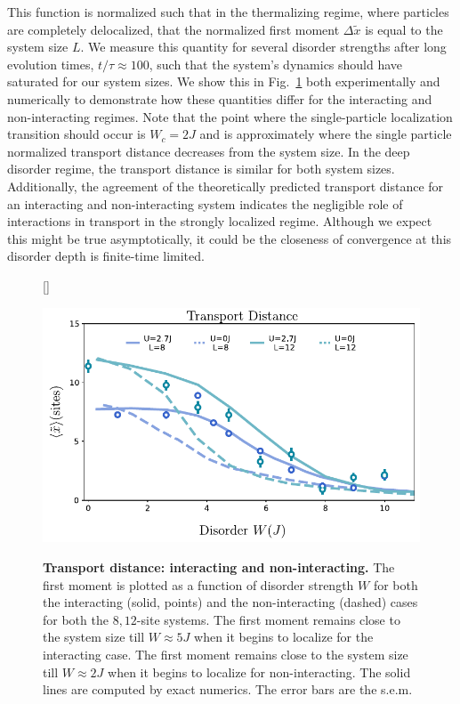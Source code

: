 This function is normalized such that in the thermalizing regime, where particles are completely delocalized, that the normalized first moment $\Delta \tilde{x}$ is equal to the system size $L$. We measure this quantity for several disorder strengths after long evolution times, $t/\tau \approx 100$, such that the system's dynamics should have saturated for our system sizes. We show this in Fig.~\ref{fig:intCorrLen} both experimentally and numerically to demonstrate how these quantities differ for the interacting and non-interacting regimes. Note that the point where the single-particle localization transition should occur is $W_c = 2 J$ and is approximately where the single particle normalized transport distance decreases from the system size. In the deep disorder regime, the transport distance is similar for both system sizes. Additionally, the agreement of the theoretically predicted transport distance for an interacting and non-interacting system indicates the negligible role of interactions in transport in the strongly localized regime. Although we expect this might be true asymptotically, it could be the closeness of convergence at this disorder depth is finite-time limited.


\begin{figure}
[\FBwidth]
{\caption{\textbf{Transport distance: interacting and non-interacting.} The first moment is plotted as a function of disorder strength $W$ for both the interacting (solid, points) and the non-interacting (dashed) cases for both the $8,12$-site systems. The first moment remains close to the system size till $W\approx5J$ when it begins to localize for the interacting case. The first moment remains close to the system size till $W\approx2J$ when it begins to localize for non-interacting. The solid lines are computed by exact numerics. The error bars are the s.e.m.}\label{fig:intCorrLen}}
{\includegraphics[width=3.5 in]{figures/ch6/XiLenComp.pdf}} 
\end{figure}


